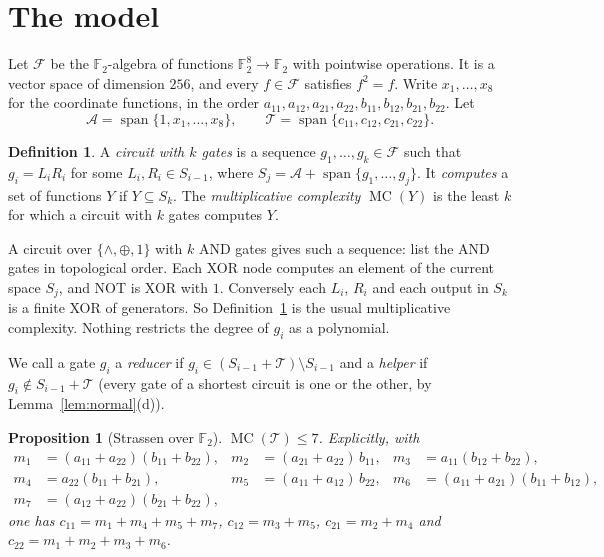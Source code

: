 \documentclass[11pt,a4paper]{article}
\newtheorem{proposition}[theorem]{Proposition}
\theoremstyle{definition}
\newtheorem{definition}[theorem]{Definition}
\newcommand{\F}{\mathbb{F}}
\newcommand{\Fn}{\mathcal{F}}
\newcommand{\Aff}{\mathcal{A}}
\newcommand{\Tg}{\mathcal{T}}
\newcommand{\MC}{\operatorname{MC}}
\newcommand{\spn}{\operatorname{span}}
\begin{document}
\section{The model}\label{sec:model}

Let $\Fn$ be the $\F_2$-algebra of functions $\F_2^8\to\F_2$ with pointwise operations. It is a vector space of dimension $256$, and every $f\in\Fn$ satisfies $f^2=f$. Write $x_1,\dots,x_8$ for the coordinate functions, in the order $a_{11},a_{12},a_{21},a_{22},b_{11},b_{12},b_{21},b_{22}$. Let
\[
\Aff=\spn\{1,x_1,\dots,x_8\},\qquad \Tg=\spn\{c_{11},c_{12},c_{21},c_{22}\}.
\]

\begin{definition}\label{def:circuit}
A \emph{circuit with $k$ gates} is a sequence $g_1,\dots,g_k\in\Fn$ such that $g_i=L_iR_i$ for some $L_i,R_i\in S_{i-1}$, where $S_j=\Aff+\spn\{g_1,\dots,g_j\}$. It \emph{computes} a set of functions $Y$ if $Y\subseteq S_k$. The \emph{multiplicative complexity} $\MC(Y)$ is the least $k$ for which a circuit with $k$ gates computes $Y$.
\end{definition}

A circuit over $\{\wedge,\oplus,1\}$ with $k$ AND gates gives such a sequence: list the AND gates in topological order. Each XOR node computes an element of the current space $S_j$, and NOT is XOR with $1$. Conversely each $L_i$, $R_i$ and each output in $S_k$ is a finite XOR of generators. So Definition~\ref{def:circuit} is the usual multiplicative complexity. Nothing restricts the degree of $g_i$ as a polynomial.

We call a gate $g_i$ a \emph{reducer} if $g_i\in(S_{i-1}+\Tg)\setminus S_{i-1}$ and a \emph{helper} if $g_i\notin S_{i-1}+\Tg$ (every gate of a shortest circuit is one or the other, by Lemma~\ref{lem:normal}(d)).

\begin{proposition}[Strassen over $\F_2$]\label{prop:strassen}
$\MC(\Tg)\le 7$. Explicitly, with
\begin{align*}
m_1&=(a_{11}+a_{22})(b_{11}+b_{22}), & m_2&=(a_{21}+a_{22})\,b_{11}, & m_3&=a_{11}(b_{12}+b_{22}),\\
m_4&=a_{22}(b_{11}+b_{21}), & m_5&=(a_{11}+a_{12})\,b_{22}, & m_6&=(a_{11}+a_{21})(b_{11}+b_{12}),\\
m_7&=(a_{12}+a_{22})(b_{21}+b_{22}),
\end{align*}
one has $c_{11}=m_1+m_4+m_5+m_7$, $c_{12}=m_3+m_5$, $c_{21}=m_2+m_4$ and $c_{22}=m_1+m_2+m_3+m_6$.
\end{proposition}
\end{document}
